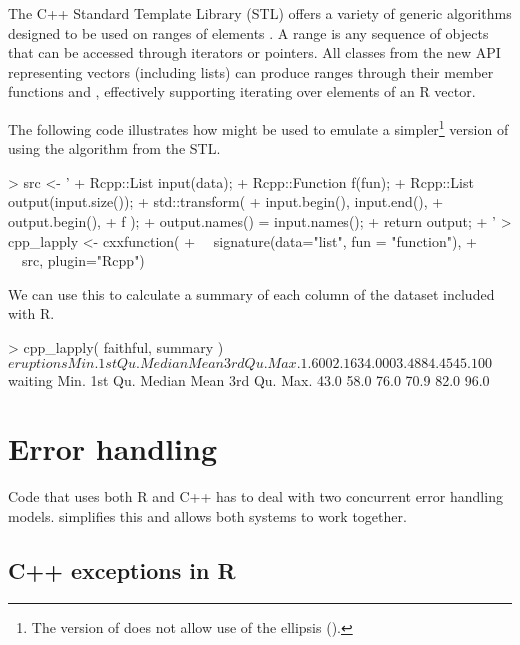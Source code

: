 The C++ Standard Template Library (STL) offers a variety of generic
algorithms designed to be used on ranges of elements
\citep{plauger_et_al:stlbook}. A range is any sequence of objects that can be
accessed through iterators or pointers.  All  classes from the new
API representing vectors (including lists) can produce ranges through their
member functions  and , effectively supporting
iterating over elements of an R vector.

The following code illustrates how  might be used
to emulate a 
simpler\footnote{The version of  does not allow use of the
ellipsis ().} version of 
using the  algorithm from the STL. 

\begin{example}
> src <- '
+   Rcpp::List input(data); 
+   Rcpp::Function f(fun);
+   Rcpp::List output(input.size());
+   std::transform( 
+   	input.begin(), input.end(), 
+   	output.begin(), 
+   	f );
+   output.names() = input.names();
+   return output;
+   '
> cpp_lapply <- cxxfunction(
+ \ \ signature(data="list", fun = "function"), 
+ \ \ src, plugin="Rcpp")
\end{example}

We can use this to calculate a summary of each 
column of the  dataset included with R.


\begin{example}
> cpp_lapply( faithful, summary )
$eruptions
 Min. 1st Qu.  Median    Mean 3rd Qu.    Max. 
1.600   2.163   4.000   3.488   4.454   5.100 

$waiting
 Min. 1st Qu.  Median    Mean 3rd Qu.    Max. 
 43.0    58.0    76.0    70.9    82.0    96.0 
\end{example}



\section{Error handling}

Code that uses both R and C++ has to deal with two concurrent
error handling models.  simplifies this and allows both 
systems to work together.

\subsection{C++ exceptions in R}

